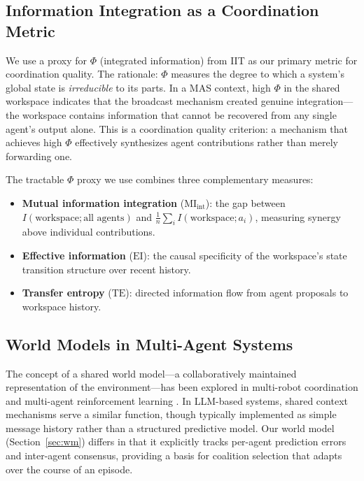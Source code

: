 \documentclass[11pt]{article}
\theoremstyle{definition}
\begin{document}
\subsection{Information Integration as a Coordination Metric}

We use a proxy for $\Phi$ (integrated information) from IIT \citep{tononi2004} as our
primary metric for coordination quality. The rationale: $\Phi$ measures the degree to
which a system's global state is \emph{irreducible} to its parts. In a MAS context,
high $\Phi$ in the shared workspace indicates that the broadcast mechanism created genuine
integration---the workspace contains information that cannot be recovered from any single
agent's output alone. This is a coordination quality criterion: a mechanism that achieves
high $\Phi$ effectively synthesizes agent contributions rather than merely forwarding one.

The tractable $\Phi$ proxy we use \citep{phua2025} combines three complementary measures:
\begin{itemize}[noitemsep]
\item \textbf{Mutual information integration} ($\text{MI}_{\text{int}}$): the gap between
  $I(\text{workspace}; \text{all agents})$ and $\frac{1}{n}\sum_i I(\text{workspace}; a_i)$,
  measuring synergy above individual contributions.
\item \textbf{Effective information} ($\text{EI}$): the causal specificity of the
  workspace's state transition structure over recent history.
\item \textbf{Transfer entropy} ($\text{TE}$): directed information flow from agent proposals
  to workspace history.
\end{itemize}

\subsection{World Models in Multi-Agent Systems}

The concept of a shared world model---a collaboratively maintained representation of the
environment---has been explored in multi-robot coordination \citep{stone2000} and
multi-agent reinforcement learning \citep{baker2020}. In LLM-based systems, shared
context mechanisms serve a similar function, though typically implemented as simple
message history rather than a structured predictive model. Our world model (Section~\ref{sec:wm})
differs in that it explicitly tracks per-agent prediction errors and inter-agent consensus,
providing a basis for coalition selection that adapts over the course of an episode.
\end{document}
